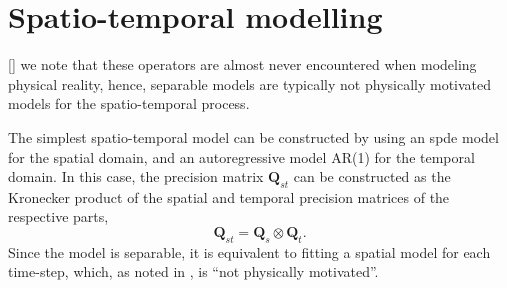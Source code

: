 \documentclass[british]{scrreprt}
\begin{document}
\section{Spatio-temporal modelling}
\label{sec:spatio-temporal-modelling}
\begin{displayquote}
    {}[\textellipsis] we note that these operators are almost never encountered when modeling physical reality, hence, separable models are typically not physically motivated models for the spatio-temporal process.
\end{displayquote}

The simplest spatio-temporal model can be constructed by using an \gls{spde} model for the spatial domain, and an autoregressive model AR(1) for the temporal domain. In this case, the precision matrix \( \symbf{Q}_{st} \) can be constructed as the Kronecker product of the spatial and temporal precision matrices of the respective parts,
\begin{equation}
    \symbf{Q}_{st} = \symbf{Q}_{s} \otimes \symbf{Q}_{t}
    \label{eq:Qst-separable}
    \text{.}
\end{equation}
Since the model is separable, it is equivalent to fitting a spatial model for each time-step, which, as noted in \cite{Lindgrendiffusionbasedspatiotemporalextension2022}, is \enquote{not physically motivated}.
\end{document}
